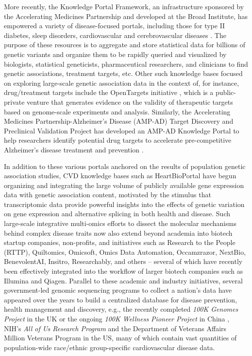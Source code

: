 \documentclass[letter]{bioinfo}
\begin{document}
More recently, the Knowledge Portal Framework, an infrastructure sponsored by the Accelerating Medicines Partnership and developed at the Broad Institute, has empowered a variety of disease-focused portals, including those for type II diabetes, sleep disorders, cardiovascular and cerebrovascular diseases \citep{Broad:2018:Cardiovascular}.  The purpose of these resources is to aggregate and store statistical data for billions of genetic variants and organize them to be rapidly queried and visualized by biologists, statistical geneticists, pharmaceutical researchers, and clinicians to find genetic associations, treatment targets, etc.  Other such knowledge bases focused on exploring large-scale genetic association data in the context of, for instance, drug/treatment targets include the OpenTargets initiative \citep{Koscielny:2017:Open}, which is a public-private venture that generates evidence on the validity of therapeutic targets based on genome-scale experiments and analysis.  Similarly, the Accelerating Medicines Partnership-Alzheimer's Disease (AMP-AD) Target Discovery and Preclinical Validation Project has developed an AMP-AD Knowledge Portal to help researchers identify potential drug targets to accelerate pre-competitive Alzheimer's disease treatment and prevention \citep{NIA:2015:AMP}.  
	
	In addition to these various portals anchored on the results of population genetic association studies, CVD knowledge bases such as HeartBioPortal \citep{Khomtchouk:2018:HeartBioPortal} have begun organizing and integrating the large volume of publicly available gene expression data with genetic association content, motivated by the stimulus that transcriptomic data provide powerful insights into the effects of genetic variation on gene expression and alternative splicing in both health and disease.  Such large-scale integrative multi-omics efforts to dissect the molecular mechanisms behind complex disease traits now also extend beyond academia into biotech startup companies, non-profits, and initiatives such as Research to the People (RTTP), Quiltomics, Omicsoft, Omics Data Automation, Occamzrazor, NextBio, BenevolentAI, Insitro, Researchably, and others -- several of which have recently been effectively integrated into the workflow of larger biotech companies such as Illumina and Qiagen.  Parallel to these academic and industry initiatives, several government-led genomic sequencing programs to collect a nation's data have appeared over the years to build a centralized database for disease prevention, health management and discovery, e.g., the recently completed \textit{100K Genomes Project} in the UK \citep{Caulfield:2017:100K} or the ongoing \textit{100K Wellness Pioneer Project} in China \citep{Kalia:2017:China}, NIH's \textit{All of Us Research Program} \citep{NIH:2018:All} and the Department of Veterans Affairs Million Veterans Program \citep{Gaziano:2016:Million} in the US, many of which contain vast quantities of population-wide race/ethnic group-specific cardiovascular disease data.  
\end{document}
